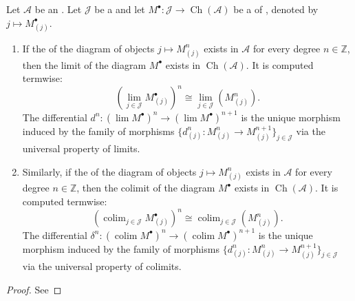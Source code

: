 \begin{proposition} \label{proposition:limit_and_colimit_or_diagram_of_chain_complexes_is_computed_pointwise}
Let $\mathcal{A}$ be an . Let $\mathcal{J}$ be a  and let $M^\bullet: \mathcal{J} \to \operatorname{Ch}(\mathcal{A})$ be a  of , denoted by $j \mapsto M^\bullet_{(j)}$.

\begin{enumerate}
    \item If the  of the diagram of objects $j \mapsto M^n_{(j)}$ exists in $\mathcal{A}$ for every degree $n \in \mathbb{Z}$, then the limit of the diagram $M^\bullet$ exists in $\operatorname{Ch}(\mathcal{A})$. It is computed termwise:
    \[
    \left( \lim_{j \in \mathcal{J}} M^\bullet_{(j)} \right)^n \cong \lim_{j \in \mathcal{J}} \left( M^n_{(j)} \right).
    \]
    The differential $d^n: (\lim M^\bullet)^n \to (\lim M^\bullet)^{n+1}$ is the unique morphism induced by the family of morphisms $\{ d^n_{(j)} : M^n_{(j)} \to M^{n+1}_{(j)} \}_{j \in \mathcal{J}}$ via the universal property of limits.

    \item Similarly, if the  of the diagram of objects $j \mapsto M^n_{(j)}$ exists in $\mathcal{A}$ for every degree $n \in \mathbb{Z}$, then the colimit of the diagram $M^\bullet$ exists in $\operatorname{Ch}(\mathcal{A})$. It is computed termwise:
    \[
    \left( \operatorname{colim}_{j \in \mathcal{J}} M^\bullet_{(j)} \right)^n \cong \operatorname{colim}_{j \in \mathcal{J}} \left( M^n_{(j)} \right).
    \]
    The differential $\delta^n: (\operatorname{colim} M^\bullet)^n \to (\operatorname{colim} M^\bullet)^{n+1}$ is the unique morphism induced by the family of morphisms $\{ d^n_{(j)} : M^n_{(j)} \to M^{n+1}_{(j)} \}_{j \in \mathcal{J}}$ via the universal property of colimits.
\end{enumerate}
\end{proposition}
\begin{proof}
    See  
\end{proof}
